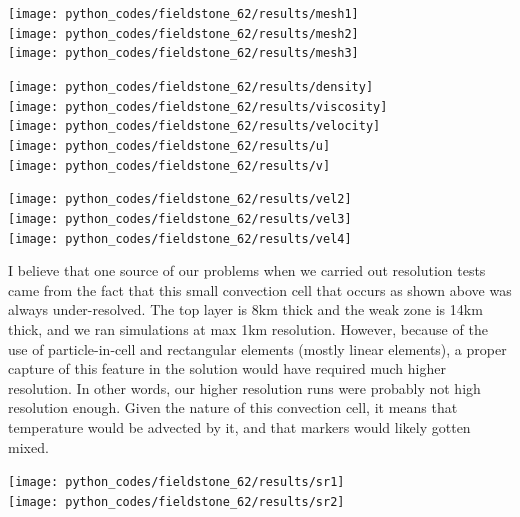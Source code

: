 \newpage
\begin{center}
\texttt{[image: python\_codes/fieldstone\_62/results/mesh1]}\\
\texttt{[image: python\_codes/fieldstone\_62/results/mesh2]}\\
\texttt{[image: python\_codes/fieldstone\_62/results/mesh3]}
\end{center}

\newpage
\begin{center}
\texttt{[image: python\_codes/fieldstone\_62/results/density]}\\
\texttt{[image: python\_codes/fieldstone\_62/results/viscosity]}\\
\texttt{[image: python\_codes/fieldstone\_62/results/velocity]}\\
\texttt{[image: python\_codes/fieldstone\_62/results/u]}\\
\texttt{[image: python\_codes/fieldstone\_62/results/v]}\\
\end{center}

\newpage
\begin{center}
\texttt{[image: python\_codes/fieldstone\_62/results/vel2]}\\
\texttt{[image: python\_codes/fieldstone\_62/results/vel3]}\\
\texttt{[image: python\_codes/fieldstone\_62/results/vel4]}
\end{center}

I believe that one source of our problems when we carried out resolution tests
came from the fact that this small convection cell that occurs as shown above was
always under-resolved. The top layer is 8km thick and the weak zone is 14km thick,
and we ran simulations at max 1km resolution. However, because of the use  
of particle-in-cell and rectangular elements (mostly linear elements), 
a proper capture of this feature in the solution would have required much higher 
resolution. In other words, our higher resolution runs were probably not high resolution enough.
Given the nature of this convection cell, it means that temperature would be advected by it, 
and that markers would likely gotten mixed. 

\newpage
\begin{center}
\texttt{[image: python\_codes/fieldstone\_62/results/sr1]}\\
\texttt{[image: python\_codes/fieldstone\_62/results/sr2]}
\end{center}



